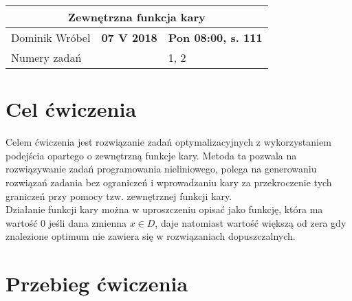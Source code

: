 \documentclass[a4paper,15pt]{article}
\begin{document}
\tableofcontents

\begin{table}
\begin{center}
\begin{tabular}{|l|l|l|}
\hline
\multicolumn{3}{|c|}{\textbf{Zewnętrzna funkcja kary}} \\ \hline Dominik Wróbel & \textbf{07 V 2018} & \textbf{Pon 08:00, s. 111} \\ \hline
\multicolumn{2}{|l|}{Numery zadań} & 1, 2 \\ \hline 

\end{tabular}
\end{center}
\end{table}

\section{Cel ćwiczenia}
Celem ćwiczenia jest rozwiązanie zadań optymalizacyjnych z wykorzystaniem podejścia opartego o zewnętrzną funkcje kary. Metoda ta pozwala na rozwiązywanie zadań programowania nieliniowego, polega na generowaniu rozwiązań zadania bez ograniczeń i wprowadzaniu kary za przekroczenie tych graniczeń przy pomocy tzw. zewnętrznej funkcji kary.  \\ Działanie funkcji kary można w uproszczeniu opisać jako funkcję, która ma wartość 0 jeśli dana zmienna \( x \in D \), daje natomiast wartość większą od zera gdy znalezione optimum nie zawiera się w rozwiązaniach dopuszczalnych.
\section{Przebieg ćwiczenia}
\end{document}

